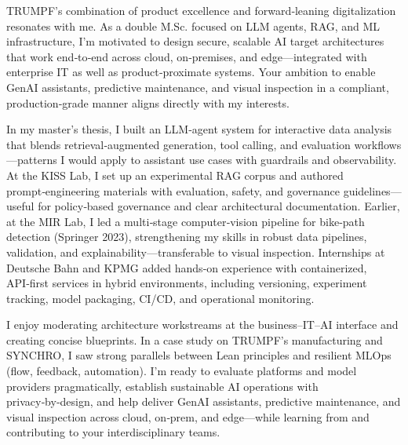 TRUMPF’s combination of product excellence and forward‑leaning digitalization resonates with me. As a double M.Sc. focused on LLM agents, RAG, and ML infrastructure, I’m motivated to design secure, scalable AI target architectures that work end‑to‑end across cloud, on‑premises, and edge—integrated with enterprise IT as well as product‑proximate systems. Your ambition to enable GenAI assistants, predictive maintenance, and visual inspection in a compliant, production‑grade manner aligns directly with my interests.

In my master’s thesis, I built an LLM‑agent system for interactive data analysis that blends retrieval‑augmented generation, tool calling, and evaluation workflows—patterns I would apply to assistant use cases with guardrails and observability. At the KISS Lab, I set up an experimental RAG corpus and authored prompt‑engineering materials with evaluation, safety, and governance guidelines—useful for policy‑based governance and clear architectural documentation. Earlier, at the MIR Lab, I led a multi‑stage computer‑vision pipeline for bike‑path detection (Springer 2023), strengthening my skills in robust data pipelines, validation, and explainability—transferable to visual inspection. Internships at Deutsche Bahn and KPMG added hands‑on experience with containerized, API‑first services in hybrid environments, including versioning, experiment tracking, model packaging, CI/CD, and operational monitoring.

I enjoy moderating architecture workstreams at the business–IT–AI interface and creating concise blueprints. In a case study on TRUMPF’s manufacturing and SYNCHRO, I saw strong parallels between Lean principles and resilient MLOps (flow, feedback, automation). I’m ready to evaluate platforms and model providers pragmatically, establish sustainable AI operations with privacy‑by‑design, and help deliver GenAI assistants, predictive maintenance, and visual inspection across cloud, on‑prem, and edge—while learning from and contributing to your interdisciplinary teams.